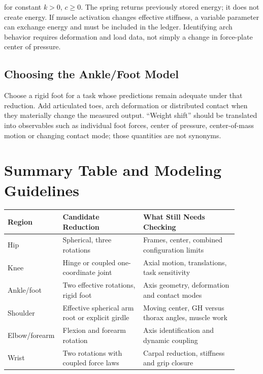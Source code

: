for constant \(k>0\), \(c\geq0\). The spring returns previously stored energy; it does not create energy. If muscle activation changes effective stiffness, a variable parameter can exchange energy and must be included in the ledger. Identifying arch behavior requires deformation and load data, not simply a change in force-plate center of pressure.

\subsection{Choosing the Ankle/Foot Model}\label{choosing-the-anklefoot-model}

Choose a rigid foot for a task whose predictions remain adequate under that reduction. Add articulated toes, arch deformation or distributed contact when they materially change the measured output. ``Weight shift'' should be translated into observables such as individual foot forces, center of pressure, center-of-mass motion or changing contact mode; those quantities are not synonyms.

\section{Summary Table and Modeling Guidelines}\label{sec-summary_table}\label{sec:summary_table}

\begin{center}
\small
\begin{tabular}{@{}p{0.16\linewidth}p{0.34\linewidth}p{0.40\linewidth}@{}}
\toprule
Region & Candidate Reduction & What Still Needs Checking \\
\midrule
Hip & Spherical, three rotations & Frames, center, combined configuration limits \\
Knee & Hinge or coupled one-coordinate joint & Axial motion, translations, task sensitivity \\
Ankle/foot & Two effective rotations, rigid foot & Axis geometry, deformation and contact modes \\
Shoulder & Effective spherical arm root or explicit girdle & Moving center, GH versus thorax angles, muscle work \\
Elbow/forearm & Flexion and forearm rotation & Axis identification and dynamic coupling \\
Wrist & Two rotations with coupled force laws & Carpal reduction, stiffness and grip closure \\
\bottomrule
\end{tabular}
\end{center}


